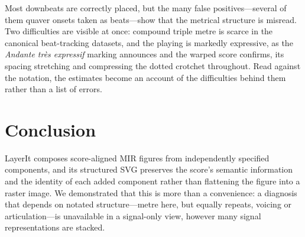 \documentclass{article}
\begin{document}
Most downbeats are correctly placed, but the many false positives---several of them quaver onsets taken as beats---show that the metrical structure is misread. Two difficulties are visible at once: compound triple metre is scarce in the canonical beat-tracking datasets, and the playing is markedly expressive, as the \emph{Andante très expressif} marking announces and the warped score confirms, its spacing stretching and compressing the dotted crotchet throughout. Read against the notation, the estimates become an account of the difficulties behind them rather than a list of errors.


\section{Conclusion}\label{sec:conclusion}


LayerIt composes score-aligned MIR figures from independently specified components, and its structured SVG preserves the score's semantic information and the identity of each added component rather than flattening the figure into a raster image. We demonstrated that this is more than a convenience: a diagnosis that depends on notated structure---metre here, but equally repeats, voicing or articulation---is unavailable in a signal-only view, however many signal representations are stacked.
\end{document}
